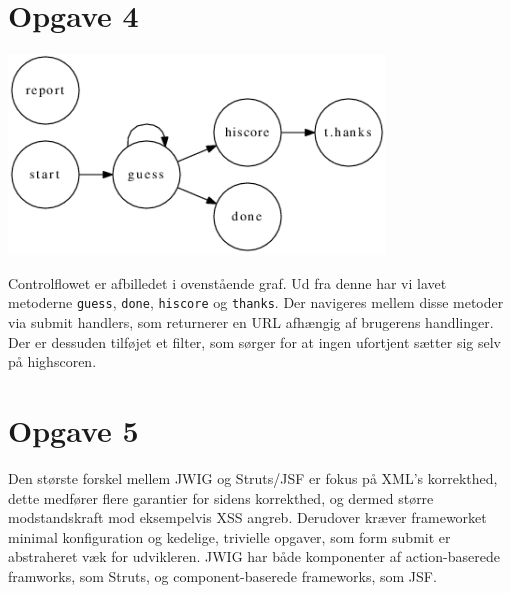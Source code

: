 \documentclass[a4paper,10pt]{article}
\begin{document}
\section*{Opgave 4}
\begin{center}
\includegraphics[width=10cm]{graphs/g0.png}
\end{center}
Controlflowet er afbilledet i ovenstående graf. Ud fra denne har vi lavet metoderne \texttt{guess},  \texttt{done},  \texttt{hiscore} og  \texttt{thanks}. Der navigeres mellem disse metoder via submit handlers, som returnerer en URL afhængig af brugerens handlinger. Der er dessuden tilføjet et filter, som sørger for at ingen ufortjent sætter sig selv på highscoren.  
\section*{Opgave 5}
Den største forskel mellem JWIG og Struts/JSF er fokus på XML's korrekthed, dette medfører flere garantier for sidens korrekthed, og dermed større modstandskraft mod eksempelvis XSS angreb. Derudover kræver frameworket minimal konfiguration og kedelige, trivielle opgaver, som form submit er abstraheret væk for udvikleren. JWIG har både komponenter af action-baserede framworks, som Struts, og component-baserede frameworks, som JSF. 

 
\end{document}

